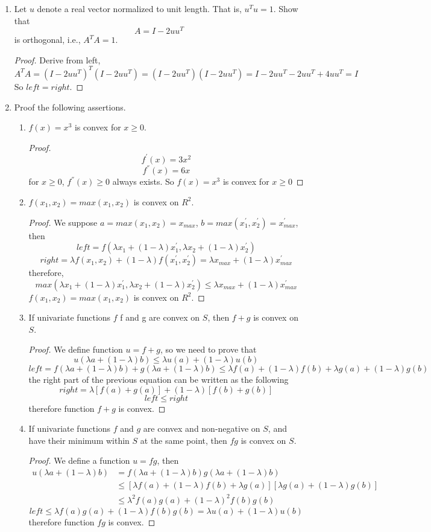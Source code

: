 \documentclass[]{book}
\theoremstyle{definition}
\begin{document}
\begin{enumerate}
\item Let $u$ denote a real vector normalized to unit length. That is, $u^T u = 1$. Show that
$$A = I - 2 u u^T $$
is orthogonal, i.e., $A^T A = 1$.
\begin{proof}
	Derive from left,
	$$A^T A = (I-2u u^T)^T(I-2u u^T) =(I-2u u^T)(I-2u u^T) = I-2u u^T - 2u u^T + 4 u u^T = I$$
	So $left = right$.	
\end{proof}
\item Proof the following assertions.
\begin{enumerate}
	\item $f(x)=x^3$ is convex for $x\geq0$.
	\begin{proof}
		$$f^{'}(x)=3x^2$$
		$$f^{''}(x)=6x$$
		for $x\geq0$, $f^{''}(x)\geq0$ always exists. So $f(x)=x^3$ is convex for $x\geq0$
	\end{proof}
	\item $f(x_1,x_2) = max(x_1,x_2)$ is convex on $R^2$.
	\begin{proof}
		We suppose $a= max(x_1, x_2) = x_{max}$, $b = max(x^{'}_1,x^{'}_2)=x^{'}_{max}$, then 
		$$left = f(\lambda x_1 + (1-\lambda) x^{'}_1 , \lambda x_2 + (1-\lambda) x^{'}_2)$$
		$$right = \lambda f(x_1,x_2) + (1 - \lambda) f(x^{'}_1,x^{'}_2)=\lambda x_{max} + (1-\lambda) x^{'}_{max}$$
		therefore,
		$$max(\lambda x_1 + (1-\lambda) x^{'}_1 , \lambda x_2 + (1-\lambda) x^{'}_2) \leq \lambda x_{max} + (1-\lambda) x^{'}_{max}$$
		$f(x_1,x_2) = max(x_1,x_2)$ is convex on $R^2$.
	\end{proof}
	\item If univariate functions $f$ f and g are convex on $S$, then $f+g$ is convex on $S$.
	\begin{proof}
		We define function $u = f+g$, so we need to prove that
		$$u(\lambda a + (1-\lambda) b ) \leq \lambda u(a) + (1-\lambda) u(b)$$
		$$ left = f(\lambda a + (1-\lambda) b)+ g(\lambda a + (1-\lambda) b) \leq \lambda f(a) + (1-\lambda) f(b) +\lambda g(a) + (1-\lambda) g(b)$$
		the right part of the previous equation can be written as the following 
		$$right = \lambda[f(a)+g(a)] + (1-\lambda)[f(b)+g(b)]$$
		$$left \leq right$$
		therefore function $f+g$ is convex.
	\end{proof}
	\item If univariate functions $f$ and $g$ are convex and non-negative on $S$, and have their minimum within $S$ at the same point, then $fg$ is convex on $S$.
	\begin{proof}
		We define a function $u=fg$, then
		\begin{equation*}		
		\begin{split}   
			    u(\lambda a + (1-\lambda) b )  & = f(\lambda a + (1-\lambda) b) g(\lambda a + (1-\lambda) b) \\ 
			    & \leq [\lambda f(a) + (1-\lambda) f(b) +\lambda g(a)] [\lambda g(a) + (1-\lambda) g(b)] \\ 
			    & \leq \lambda^2 f(a)g(a) + (1-\lambda)^2 f(b)g(b)
		\end{split}
		\end{equation*}
		$$ left \leq \lambda f(a)g(a) + (1-\lambda)f(b)g(b) = \lambda u(a) + (1-\lambda)u(b)$$
		therefore function  $fg$ is convex.
	

\end{proof}
\end{enumerate}
\end{enumerate}
\end{document}
